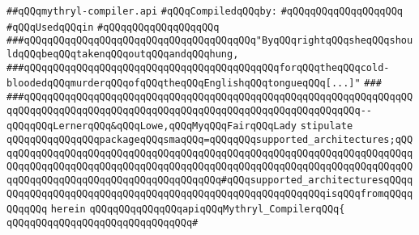 \label{src/lib/compiler/toplevel/compiler/mythryl-compiler.api}
\verb|##qQQqmythryl-compiler.api|\newline
\newline
\verb|#qQQqCompiledqQQqby:|\newline
\verb|#qQQqqQQqqQQqqQQqqQQq|\newline
\newline
\verb|#qQQqUsedqQQqin|\newline
\verb|#qQQqqQQqqQQqqQQqqQQq|\newline
\newline
\newline
\newline
\verb|###qQQqqQQqqQQqqQQqqQQqqQQqqQQqqQQqqQQqqQQq"ByqQQqrightqQQqsheqQQqshouldqQQqbeqQQqtakenqQQqoutqQQqandqQQqhung,|\newline
\verb|###qQQqqQQqqQQqqQQqqQQqqQQqqQQqqQQqqQQqqQQqqQQqforqQQqtheqQQqcold-bloodedqQQqmurderqQQqofqQQqtheqQQqEnglishqQQqtongueqQQq[...]"|\newline
\verb|###|\newline
\verb|###qQQqqQQqqQQqqQQqqQQqqQQqqQQqqQQqqQQqqQQqqQQqqQQqqQQqqQQqqQQqqQQqqQQqqQQqqQQqqQQqqQQqqQQqqQQqqQQqqQQqqQQqqQQqqQQqqQQqqQQqqQQqqQQq--qQQqqQQqLernerqQQq&qQQqLowe,qQQqMyqQQqFairqQQqLady|\newline
\newline
\newline
\newline
\verb|stipulate|\newline
\verb|qQQqqQQqqQQqqQQqpackageqQQqsmaqQQq=qQQqqQQqsupported_architectures;qQQqqQQqqQQqqQQqqQQqqQQqqQQqqQQqqQQqqQQqqQQqqQQqqQQqqQQqqQQqqQQqqQQqqQQqqQQqqQQqqQQqqQQqqQQqqQQqqQQqqQQqqQQqqQQqqQQqqQQqqQQqqQQqqQQqqQQqqQQqqQQqqQQqqQQqqQQqqQQqqQQqqQQqqQQqqQQqqQQq#qQQqsupported_architecturesqQQqqQQqqQQqqQQqqQQqqQQqqQQqqQQqqQQqqQQqqQQqqQQqqQQqqQQqqQQqisqQQqfromqQQqqQQqqQQq|\newline
\verb|herein|\newline
\newline
\verb|qQQqqQQqqQQqqQQqapiqQQqMythryl_CompilerqQQq{|\newline
\verb|qQQqqQQqqQQqqQQqqQQqqQQqqQQqqQQq#|\newline
